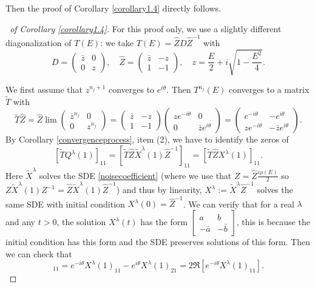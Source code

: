 \documentclass[12pt, reqno]{amsart}
\theoremstyle{definition}
\theoremstyle{remark}
\numberwithin{equation}{section}
\begin{document}
Then the proof of Corollary \ref{corollary1.4} directly follows.

\begin{proof}[\proofname\ of Corollary \ref{corollary1.4}]For this proof only, we use a slightly different diagonalization of $T(E)$: we take $T(E)=\hat{Z}D\hat{Z}^{-1}$ with 
\begin{equation}
    D=\begin{pmatrix}
        \bar{z}&0\\0&z
\end{pmatrix},\quad \hat{Z}=\begin{pmatrix}
    \bar{z}&-z\\1&-1
\end{pmatrix},\quad z=\frac{E}{2}+i\sqrt{1-\frac{E^2}{4}}.
\end{equation}



We first assume that $z^{n_j+1}$ converges to $e^{i\theta}$.
Then $T^{n_j}(E)$ converges to a matrix $\tilde{T}$ with
$$
\tilde{T}\hat{Z}=\hat{Z}\lim\begin{pmatrix}\bar{z}^{n_j}&0\\0&z^{n_j}\end{pmatrix}=\begin{pmatrix}
\bar{z}&-z\\1&-1
\end{pmatrix}
\begin{pmatrix}
ze^{-i\theta}&0\\0&\bar{z}e^{i\theta}
\end{pmatrix}=\begin{pmatrix}
    e^{-i\theta}&-e^{i\theta}\\ze^{-i\theta}&-\bar{z}e^{i\theta}
\end{pmatrix}.
$$
By Corollary \ref{convergenceprocess}, item (2), we have to identify the zeros of 
$$
[\tilde{T}Q^\lambda(1)]_{11}=[\tilde{T}\hat{Z}\tilde{X}^\lambda(1)\hat{Z}^{-1}]_{11}=[\tilde{T}\hat{Z}X^\lambda(1)]_{11}.
$$Here $\tilde{X}^\lambda$ solves the SDE \eqref{noisecoefficient} (where we use that $Z=\hat{Z}\frac{i\rho(E)}{2}$ so $Z\tilde{X}^\lambda(1)Z^{-1}=\hat{Z}\tilde{X}^\lambda(1)\hat{Z}^{-1}$) and thus by linearity, $X^\lambda:=\tilde{X}^\lambda \hat{Z}^{-1}$ solves the same SDE with initial condition $X^\lambda(0)=\hat{Z}^{-1}$.
We can verify that for a real $\lambda$ and any $t>0$, the solution $X^\lambda(t)$ has the form $\begin{bmatrix} a&b\\ -\bar{a}&-\bar{b}
\end{bmatrix}$, this is because the initial condition has this form and the SDE preserves solutions of this form. 
Then we can check that 
\begin{equation}
    [\tilde{T}\hat{Z}X^\lambda(1)]_{11}=e^{-i\theta}X^\lambda(1)_{11}-e^{i\theta}X^\lambda(1)_{21}=2\Re[e^{-i\theta}X^\lambda(1)_{11}].
\end{equation}


\end{proof}
\end{document}
